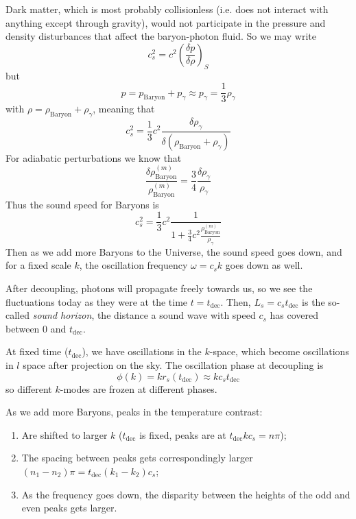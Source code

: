 \par Dark matter, which is most probably collisionless (i.e. does not interact with anything except through gravity), would not participate in the pressure and density disturbances that affect the baryon-photon fluid. So we may write
\begin{equation*}
    c_{s}^{2} = c^{2}\left(\frac{\delta p}{\delta \rho}\right)_{S}
\end{equation*}
but 
\begin{equation*}
    p = p_{\text{Baryon}}+p_{\gamma} \approx p_{\gamma} = \frac{1}{3}\rho_{\gamma}
\end{equation*}
with $\rho = \rho_{\text{Baryon}}+\rho_{\gamma}$, meaning that 
\begin{equation*}
    c_{s}^{2} = \frac{1}{3}c^{2}\frac{\delta\rho_{\gamma}}{\delta(\rho_{\text{Baryon}}+\rho_{\gamma})}
\end{equation*}
For adiabatic perturbations we know that 
\begin{equation*}
    \frac{\delta \rho^{(m)}_{\text{Baryon}}}{\rho^{(m)}_{\text{Baryon}}} = \frac{3}{4}\frac{\delta\rho_{\gamma}}{\rho_{\gamma}}
\end{equation*}
Thus the sound speed for Baryons is
\begin{equation}
    c_{s}^{2} = \frac{1}{3}c^{2}\frac{1}{1+\frac{3}{4}c^{2}\frac{\rho^{(m)}_{\text{Baryon}}}{\rho_{\gamma}}}
    \label{eq:soundspeedbaryons}
\end{equation}
Then as we add more Baryons to the Universe, the sound speed goes down, and for a fixed scale $k$, the oscillation frequency $\omega = c_{s}k$ goes down as well.
\par After decoupling, photons will propagate freely towards us, so we see the fluctuations today as they were at the time $t = t_{\text{dec}}$. Then, $L_{s} = c_{s}t_{\text{dec}}$ is the so-called \emph{sound horizon}, the distance a sound wave with speed $c_{s}$ has covered between 0 and $t_{\text{dec}}$.
\par At fixed time ($t_{\text{dec}}$), we have oscillations in the $k$-space, which become oscillations in $l$ space after projection on the sky. The oscillation phase at decoupling is
\begin{equation*}
    \phi(k) = kr_{s}(t_{\text{dec}}) \approx kc_{s}t_{\text{dec}}
\end{equation*}
so different $k$-modes are frozen at different phases.
\par As we add more Baryons, peaks in the temperature contrast:
\begin{enumerate}
    \item Are shifted to larger $k$ ($t_{\text{dec}}$ is fixed, peaks are at $t_{\text{dec}}kc_{s} = n\pi$);
    \item The spacing between peaks gets correspondingly larger $(n_{1}-n_{2})\pi = t_{\text{dec}}(k_{1}-k_{2})c_{s}$;
    \item As the frequency goes down, the disparity between the heights of the odd and even peaks gets larger.
\end{enumerate}
